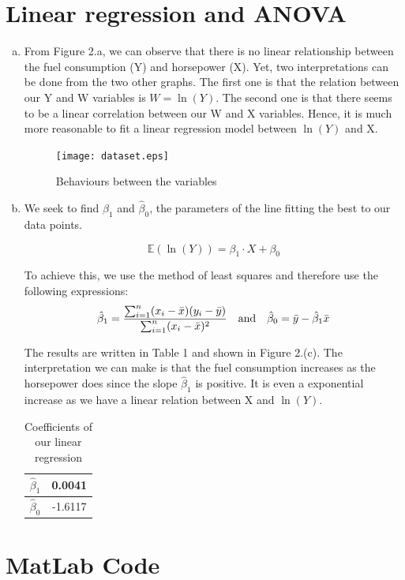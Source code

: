 \documentclass[a4paper]{article}
\begin{document}

\newpage

\section{Linear regression and ANOVA}

\begin{enumerate}[(a)]

\item From Figure 2.a, we can observe that there is no linear relationship between the fuel consumption (Y) and horsepower (X). Yet, two interpretations can be done from the two other graphs. The first one is that the relation between our Y and W variables is $W = \ln(Y)$. The second one is that there seems to be a linear correlation between our W and X variables. Hence, it is much more reasonable to fit a linear regression model between $\ln(Y)$ and X.

\begin{figure}
    \centering
    \texttt{[image: dataset.eps]}
    \caption{Behaviours between the variables}
\end{figure}

\item We seek to find $\hat{\beta}_1$ and $\hat{\beta}_0$, the parameters of the line fitting the best to our data points. 

$$\mathbb{E}(\ln(Y)) = \beta_1 \cdot X + \beta_0$$

To achieve this, we use the method of least squares and therefore use the following expressions:
$$\hat{\beta}_1 = \frac{\sum_{i=1}^{n}(x_i-\bar{x})(y_i-\bar{y})}{\sum_{i=1}^n(x_i-\bar{x})^2}
\quad \textup{and} \quad \hat{\beta}_0 = \bar{y} - \hat{\beta}_1 \bar{x}$$

The results are written in Table 1 and shown in Figure 2.(c). The interpretation we can make is that the fuel consumption increases as the horsepower does since the slope $\hat{\beta}_1$ is positive. It is even a exponential increase as we have a linear relation between X and $\ln(Y)$.

\begin{table}[h]
    \begin{centering}
    \begin{tabular}{|c|c|}
    \hline 
    $\hat{\beta}_1$ & 0.0041\tabularnewline
    \hline 
    $\hat{\beta}_0$ & -1.6117\tabularnewline
    \hline 
    \end{tabular}
    \par\end{centering}
    \caption{Coefficients of our linear regression}
\end{table}

\end{enumerate}


\newpage

\appendix

\section{MatLab Code}
\end{document}
